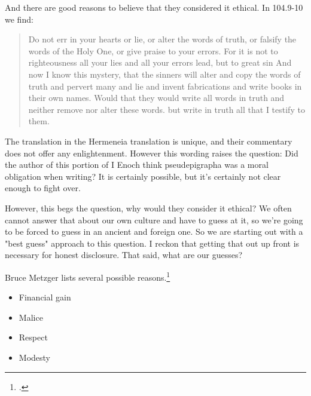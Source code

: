 \documentclass{article}
\begin{document}
And there are good reasons to believe that they considered it ethical.
In 104.9-10 we find:
\begin{quote}
Do not err in your hearts or lie,\newline
or alter the words of truth,\newline
or falsify the words of the Holy One,\newline
or give praise to your errors.\newline
For it is not to righteousness\newline
all your lies and all your errors\newline
lead, but to great sin\newline
And now I know this mystery,\newline
that the sinners will alter and\newline
copy the words of truth\newline
and pervert many and lie and\newline
invent fabrications and write\newline
books in their own names.\newline
Would that they would write all\newline
words in truth and neither\newline
remove nor alter these words.\newline
but write in truth all\newline
that I testify to them.
\end{quote}
The translation in the Hermeneia translation is unique, and their commentary does not offer any enlightenment.
However this wording raises the question:
Did the author of this portion of I Enoch think pseudepigrapha was a moral obligation when writing?
It is certainly possible, but it's certainly not clear enough to fight over.

However, this begs the question, why would they consider it ethical?
We often cannot answer that about our own culture and have to guess at it, so we're going to be forced to guess in an ancient and foreign one.
So we are starting out with a "best guess" approach to this question.
I reckon that getting that out up front is necessary for honest disclosure.
That said, what are our guesses?

Bruce Metzger lists several possible reasons.\footcite{BMetzger1972}
\begin{itemize}
  \item Financial gain
  \item Malice
  \item Respect
  \item Modesty
\end{itemize}
\end{document}
